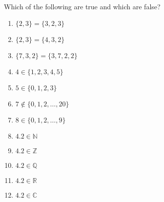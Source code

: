 \begin{xca}
		Which of the following are true and which are false?
			
		\begin{enumerate}
			\item $\{2,3\} = \{3, 2,3\}$
			\item $\{2,3\} = \{4,3,2\}$
			\item $\{7,3,2\} = \{3,7,2,2\}$
			\item $4 \in \{1,2,3,4,5\}$
			\item $5 \in \{0,1,2,3\}$
			\item $7 \notin \{0,1,2, \dots, 20\}$
			\item $8 \in \{0,1,2, \dots,  9\}$
			\item $4.2 \in \mathbb{N}$
			\item $4.2 \in \mathbb{Z}$
			\item $4.2 \in \mathbb{Q}$
			\item $4.2 \in \mathbb{R}$
			\item $4.2 \in \mathbb{C}$
			\end{enumerate}
		
\end{xca}

